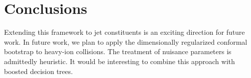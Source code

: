 \section{Conclusions}\label{sec:conclusions}

Extending this framework to jet constituents is an exciting direction
for future work. In future work, we plan to apply the dimensionally
regularized conformal bootstrap to heavy-ion collisions. The treatment
of nuisance parameters is admittedly heuristic. It would be interesting
to combine this approach with boosted decision trees.

